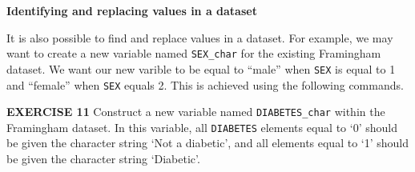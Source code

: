 \documentclass[
]{article}
\newenvironment{Shaded}{\begin{snugshade}}{\end{snugshade}}
\newcommand{\CommentTok}[1]{\textcolor[rgb]{0.56,0.35,0.01}{\textit{#1}}}
\newcommand{\DecValTok}[1]{\textcolor[rgb]{0.00,0.00,0.81}{#1}}
\newcommand{\KeywordTok}[1]{\textcolor[rgb]{0.13,0.29,0.53}{\textbf{#1}}}
\newcommand{\NormalTok}[1]{#1}
\newcommand{\OperatorTok}[1]{\textcolor[rgb]{0.81,0.36,0.00}{\textbf{#1}}}
\newcommand{\OtherTok}[1]{\textcolor[rgb]{0.56,0.35,0.01}{#1}}
\newcommand{\StringTok}[1]{\textcolor[rgb]{0.31,0.60,0.02}{#1}}
\begin{document}
\begin{Shaded}
\end{Shaded}

\textbf{Identifying and replacing values in a dataset}

It is also possible to find and replace values in a dataset. For
example, we may want to create a new variable named \texttt{SEX\_char}
for the existing Framingham dataset. We want our new varible to be equal
to ``male'' when \texttt{SEX} is equal to 1 and ``female'' when
\texttt{SEX} equals 2. This is achieved using the following commands.

\begin{Shaded}
\end{Shaded}

\textbf{EXERCISE 11} Construct a new variable named
\texttt{DIABETES\_char} within the Framingham dataset. In this variable,
all \texttt{DIABETES} elements equal to `0' should be given the
character string `Not a diabetic', and all elements equal to `1' should
be given the character string `Diabetic'.
\end{document}
